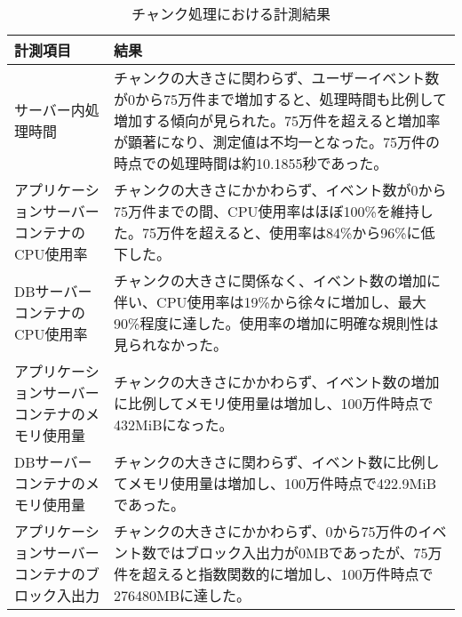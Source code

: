\documentclass[../../../main]{subfiles}
\begin{document}
    \begin{table}[H]
        \centering
        \caption{チャンク処理における計測結果}
        \label{tab:result-chunk}
        \begin{tabular}{|p{4cm}|p{10cm}|}
            \hline
            \textbf{計測項目}                & \textbf{結果}                                                                                                                                                                \\ \hline
            サーバー内処理時間                    & チャンクの大きさに関わらず、ユーザーイベント数が0から75万件まで増加すると、処理時間も比例して増加する傾向が見られた。75万件を超えると増加率が顕著になり、測定値は不均一となった。75万件の時点での処理時間は約10.1855秒であった。                                                    \\ \hline
            アプリケーションサーバーコンテナのCPU使用率      & チャンクの大きさにかかわらず、イベント数が0から75万件までの間、CPU使用率はほぼ100\%を維持した。75万件を超えると、使用率は84\%から96\%に低下した。                                                                                        \\ \hline
            DBサーバーコンテナのCPU使用率            & チャンクの大きさに関係なく、イベント数の増加に伴い、CPU使用率は19\%から徐々に増加し、最大90\%程度に達した。使用率の増加に明確な規則性は見られなかった。                                                                                          \\ \hline
            アプリケーションサーバーコンテナのメモリ使用量      & チャンクの大きさにかかわらず、イベント数の増加に比例してメモリ使用量は増加し、100万件時点で432MiBになった。                                                                                                                 \\ \hline
            DBサーバーコンテナのメモリ使用量            & チャンクの大きさに関わらず、イベント数に比例してメモリ使用量は増加し、100万件時点で422.9MiBであった。                                                                                                                   \\ \hline
            アプリケーションサーバーコンテナのブロック入出力     & チャンクの大きさにかかわらず、0から75万件のイベント数ではブロック入出力が0MBであったが、75万件を超えると指数関数的に増加し、100万件時点で276480MBに達した。                                                                                    \\ \hline

\end{tabular}
\end{table}
\end{document}
